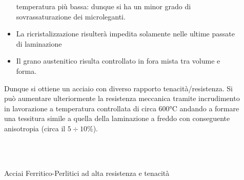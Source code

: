 \begin{description}
\begin{itemize}
	temperatura più bassa: dunque si ha un minor grado di sovrassaturazione dei microleganti.
	\item La ricristalizzazione risulterà impedita solamente nelle ultime passate di laminazione
	\item Il grano austenitico risulta controllato in fora mista tra volume e forma.
	\end{itemize}
Dunque si ottiene un acciaio con diverso rapporto tenacità/resistenza.
Si può aumentare ulteriormente la resistenza meccanica tramite incrudimento in
lavorazione a temperatura controllata di circa $600\unit{\celsius}$ andando a formare
una tessitura simile a quella della laminazione a freddo con conseguente anisotropia 
(circa il $5 \div 10\%$).
\end{description}

\begin{figure}
\centering
{}\\
\quad
{}\\
\caption{Acciai Ferritico-Perlitici ad alta resistenza e tenacità}
\label{fig:FerPerHSHR}
\end{figure}

\newpage
